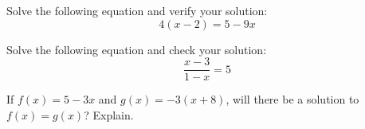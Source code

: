 \documentclass[11pt,letterpaper]{article}
\begin{document}

 Solve the following equation and verify your solution:
	\[
	4(x - 2)= 5 - 9x
	\]



\newpage



 Solve the following equation and check your solution:
	\[
	\dfrac{x - 3}{1 - x}= 5
	\]



\newpage



 If $f(x)= 5 - 3x$ and $g(x)= -3(x + 8)$, will there be a solution to $f(x)= g(x)$? Explain. 
\end{document}
